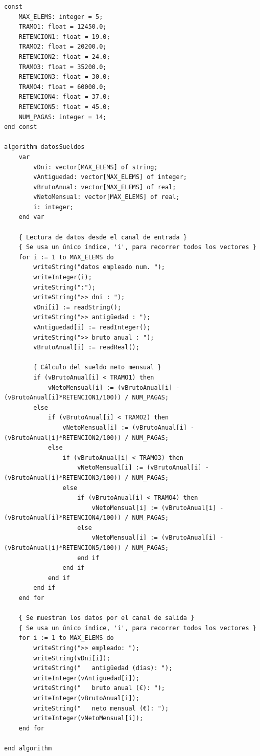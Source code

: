 \documentclass[
]{book}
\begin{document}
\begin{verbatim}
const
    MAX_ELEMS: integer = 5;
    TRAMO1: float = 12450.0;
    RETENCION1: float = 19.0;
    TRAMO2: float = 20200.0;
    RETENCION2: float = 24.0;
    TRAMO3: float = 35200.0;
    RETENCION3: float = 30.0;
    TRAMO4: float = 60000.0;
    RETENCION4: float = 37.0;
    RETENCION5: float = 45.0;
    NUM_PAGAS: integer = 14;
end const

algorithm datosSueldos
    var
        vDni: vector[MAX_ELEMS] of string;
        vAntiguedad: vector[MAX_ELEMS] of integer;
        vBrutoAnual: vector[MAX_ELEMS] of real;
        vNetoMensual: vector[MAX_ELEMS] of real;
        i: integer;
    end var

    { Lectura de datos desde el canal de entrada }
    { Se usa un único índice, 'i', para recorrer todos los vectores }
    for i := 1 to MAX_ELEMS do
        writeString("datos empleado num. ");
        writeInteger(i);
        writeString(":");
        writeString(">> dni : ");
        vDni[i] := readString();
        writeString(">> antigüedad : ");
        vAntiguedad[i] := readInteger();
        writeString(">> bruto anual : ");
        vBrutoAnual[i] := readReal();
        
        { Cálculo del sueldo neto mensual }
        if (vBrutoAnual[i] < TRAMO1) then
            vNetoMensual[i] := (vBrutoAnual[i] - (vBrutoAnual[i]*RETENCION1/100)) / NUM_PAGAS;
        else
            if (vBrutoAnual[i] < TRAMO2) then
                vNetoMensual[i] := (vBrutoAnual[i] - (vBrutoAnual[i]*RETENCION2/100)) / NUM_PAGAS;
            else
                if (vBrutoAnual[i] < TRAMO3) then
                    vNetoMensual[i] := (vBrutoAnual[i] - (vBrutoAnual[i]*RETENCION3/100)) / NUM_PAGAS;
                else
                    if (vBrutoAnual[i] < TRAMO4) then
                        vNetoMensual[i] := (vBrutoAnual[i] - (vBrutoAnual[i]*RETENCION4/100)) / NUM_PAGAS;
                    else
                        vNetoMensual[i] := (vBrutoAnual[i] - (vBrutoAnual[i]*RETENCION5/100)) / NUM_PAGAS;
                    end if
                end if
            end if
        end if
    end for
   
    { Se muestran los datos por el canal de salida }
    { Se usa un único índice, 'i', para recorrer todos los vectores }
    for i := 1 to MAX_ELEMS do
        writeString(">> empleado: ");
        writeString(vDni[i]);
        writeString("   antigüedad (días): ");
        writeInteger(vAntiguedad[i]);
        writeString("   bruto anual (€): ");
        writeInteger(vBrutoAnual[i]);
        writeString("   neto mensual (€): ");
        writeInteger(vNetoMensual[i]);
    end for

end algorithm
\end{verbatim}
\end{document}
